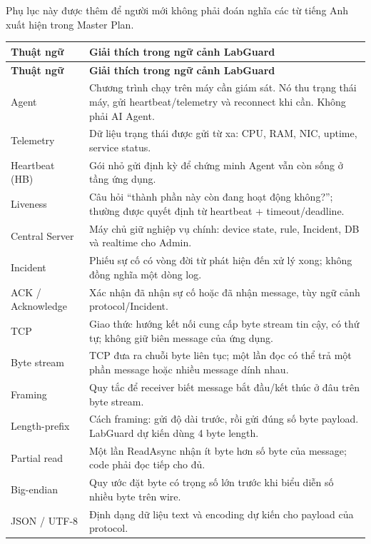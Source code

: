 
Phụ lục này được thêm để người mới không phải đoán nghĩa các từ tiếng Anh xuất hiện trong Master Plan.

\begin{longtable}{p{3.4cm} p{11.2cm}}
\toprule
\textbf{Thuật ngữ} & \textbf{Giải thích trong ngữ cảnh LabGuard} \\
\midrule
\endfirsthead
\toprule
\textbf{Thuật ngữ} & \textbf{Giải thích trong ngữ cảnh LabGuard} \\
\midrule
\endhead
Agent & Chương trình chạy trên máy cần giám sát. Nó thu trạng thái máy, gửi heartbeat/telemetry và reconnect khi cần. Không phải AI Agent. \\
Telemetry & Dữ liệu trạng thái được gửi từ xa: CPU, RAM, NIC, uptime, service status. \\
Heartbeat (HB) & Gói nhỏ gửi định kỳ để chứng minh Agent vẫn còn sống ở tầng ứng dụng. \\
Liveness & Câu hỏi ``thành phần này còn đang hoạt động không?''; thường được quyết định từ heartbeat + timeout/deadline. \\
Central Server & Máy chủ giữ nghiệp vụ chính: device state, rule, Incident, DB và realtime cho Admin. \\
Incident & Phiếu sự cố có vòng đời từ phát hiện đến xử lý xong; không đồng nghĩa một dòng log. \\
ACK / Acknowledge & Xác nhận đã nhận sự cố hoặc đã nhận message, tùy ngữ cảnh protocol/Incident. \\
TCP & Giao thức hướng kết nối cung cấp byte stream tin cậy, có thứ tự; không giữ biên message của ứng dụng. \\
Byte stream & TCP đưa ra chuỗi byte liên tục; một lần đọc có thể trả một phần message hoặc nhiều message dính nhau. \\
Framing & Quy tắc để receiver biết message bắt đầu/kết thúc ở đâu trên byte stream. \\
Length-prefix & Cách framing: gửi độ dài trước, rồi gửi đúng số byte payload. LabGuard dự kiến dùng 4 byte length. \\
Partial read & Một lần ReadAsync nhận ít byte hơn số byte của message; code phải đọc tiếp cho đủ. \\
Big-endian & Quy ước đặt byte có trọng số lớn trước khi biểu diễn số nhiều byte trên wire. \\
JSON / UTF-8 & Định dạng dữ liệu text và encoding dự kiến cho payload của protocol. \\

\end{longtable}
